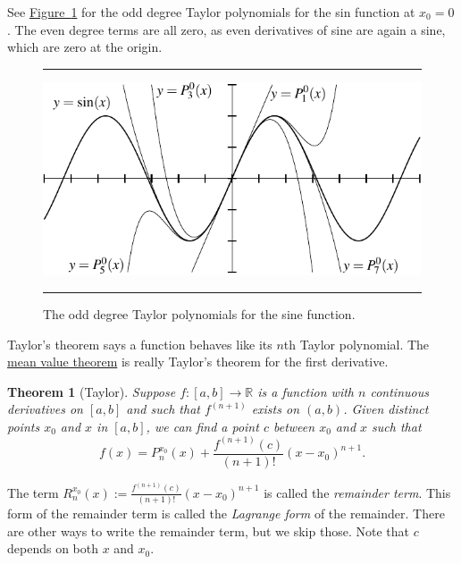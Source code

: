 \documentclass[12pt]{book}
\newenvironment{myfigureht}{%
\begin{figure}[h!t]
\noindent\rule{\textwidth}{0.4pt}\vspace{12pt}\par\centering}%
{\par\noindent\rule{\textwidth}{0.4pt}
\end{figure}}
\newcommand{\R}{{\mathbb{R}}}
\newcommand{\myindex}[1]{#1\index{#1}}
\theoremstyle{plain}
\newtheorem{thm}{Theorem}[section]
\theoremstyle{remark}
\theoremstyle{definition}
\theoremstyle{exercise}
\theoremstyle{example}
\newcommand{\figureref}[1]{\hyperref[#1]{Figure~\ref*{#1}}}
\begin{document}
See \figureref{fig:taylorsin} for
the odd degree Taylor polynomials for the sin function at $x_0=0$.
The even degree terms are all zero, as even derivatives 
of sine are again a sine, which are zero at the origin.
\begin{myfigureht}
\includegraphics{figures/taylorsin}
\caption{The odd degree Taylor polynomials for the sine
function.\label{fig:taylorsin}}
\end{myfigureht}

Taylor's theorem says a function behaves like its $n$th
Taylor polynomial.  The 
\hyperref[thm:mvt]{mean value theorem} is really Taylor's theorem
for the first derivative.

\begin{thm}[Taylor] \label{thm:taylor}
Suppose $f \colon [a,b] \to \R$ is a function with $n$ continuous
derivatives on $[a,b]$ and such that $f^{(n+1)}$ exists on $(a,b)$.
Given distinct points $x_0$ and $x$ in $[a,b]$,
we can find a point $c$ between $x_0$
and $x$ such that
\begin{equation*}
f(x)=P_{n}^{x_0}(x)+\frac{f^{(n+1)}(c)}{(n+1)!}{(x-x_0)}^{n+1} .
\end{equation*}
\end{thm}

The term $R_n^{x_0}(x):=\frac{f^{(n+1)}(c)}{(n+1)!}{(x-x_0)}^{n+1}$ is called the
\emph{remainder term}.  This
form 
of the remainder term is called the
\emph{\myindex{Lagrange form}} of the remainder.  There are other ways
to write the remainder term, but we skip those.  Note that $c$ depends on
both $x$ and $x_0$.
\end{document}
